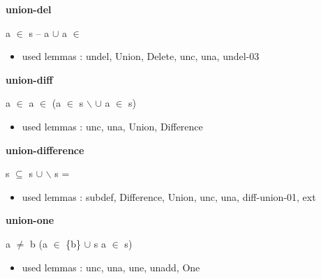 \documentclass[a4paper]{article}
\begin{document}
\medskip

\bigskip

{\large\bf union-del}

\medskip

 \Fol a $\in$ s -- a $\cup$  \Equiv a $\in$ 

\begin{itemize}


\item       used lemmas  : undel, Union, Delete, unc, una, undel-03

\end{itemize}

\medskip

\bigskip

{\large\bf union-diff}

\medskip

 \Fol \Not a $\in$  \And \Not a $\in$  \Imp (a $\in$ s $\backslash$  $\cup$  \Equiv a $\in$ s)

\begin{itemize}


\item       used lemmas  : unc, una, Union, Difference

\end{itemize}

\medskip

\bigskip

{\large\bf union-difference}

\medskip

 \Fol s $\subseteq$  \Imp s $\cup$  $\backslash$ s = 

\begin{itemize}


\item       used lemmas  : subdef, Difference, Union, unc, una, diff-union-01, ext

\end{itemize}

\medskip

\bigskip

{\large\bf union-one}

\medskip

 \Fol a $\neq$ b \Imp (a $\in$ \{b\} $\cup$ s \Equiv a $\in$ s)

\begin{itemize}


\item       used lemmas  : unc, una, une, unadd, One

\end{itemize}
\end{document}
